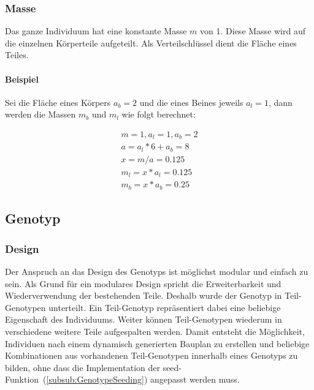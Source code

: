       \subsubsection{Masse\label{subsub:Mass}}

        Das ganze Individuum hat eine konstante Masse \(m\) von 1.
        Diese Masse wird auf die einzelnen Körperteile aufgeteilt.
        Als Verteilschlüssel dient die Fläche eines Teiles.

        \paragraph{Beispiel\label{par:MassExample}}

          Sei die Fläche eines Körpers \(a_{b} = 2 \) und die eines Beines jeweils \(a_{l} = 1\),
          dann werden die Massen \(m_{b}\) und \(m_{l}\) wie folgt berechnet:

          \begin{gather*}
            m = 1, a_{l} = 1, a_{b} = 2 \\
            a = a_{l} * 6 + a_{b} = 8 \\
            x = m / a = 0.125 \\
            m_{l} = x * a_{l} = 0.125 \\
            m_{b} = x * a_{b} = 0.25
          \end{gather*}

    \subsection{Genotyp\label{sub:Genotype}}

      \subsubsection{Design\label{subsub:GenotypeDesign}}

        Der Anspruch an das Design des Genotyps ist möglichst modular und einfach zu sein.
        Als Grund für ein modulares Design spricht die Erweiterbarkeit und Wiederverwendung der bestehenden Teile.
        Deshalb wurde der Genotyp in Teil-Genotypen unterteilt.
        Ein Teil-Genotyp repräsentiert dabei eine beliebige Eigenschaft des Individuums.
        Weiter können Teil-Genotypen wiederum in verschiedene weitere Teile aufgespalten werden.
        Damit entsteht die Möglichkeit, Individuen nach einem dynamisch generierten Bauplan zu erstellen
        und beliebige Kombinationen aus vorhandenen Teil-Genotypen innerhalb eines Genotyps zu bilden,
        ohne dass die Implementation der seed-Funktion~(\vref{subsub:GenotypeSeeding}) angepasst werden muss.

